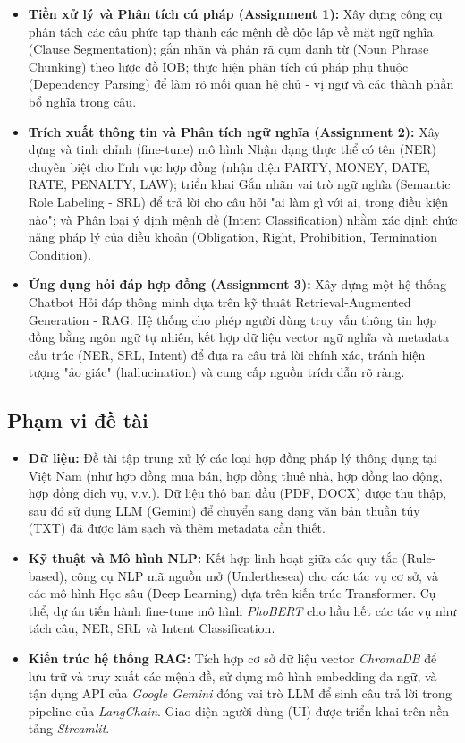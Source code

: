 \begin{itemize}
    \item \textbf{Tiền xử lý và Phân tích cú pháp (Assignment 1):} Xây dựng công cụ phân tách các câu phức tạp thành các mệnh đề độc lập về mặt ngữ nghĩa (Clause Segmentation); gắn nhãn và phân rã cụm danh từ (Noun Phrase Chunking) theo lược đồ IOB; thực hiện phân tích cú pháp phụ thuộc (Dependency Parsing) để làm rõ mối quan hệ chủ - vị ngữ và các thành phần bổ nghĩa trong câu.
    \item \textbf{Trích xuất thông tin và Phân tích ngữ nghĩa (Assignment 2):} Xây dựng và tinh chỉnh (fine-tune) mô hình Nhận dạng thực thể có tên (NER) chuyên biệt cho lĩnh vực hợp đồng (nhận diện PARTY, MONEY, DATE, RATE, PENALTY, LAW); triển khai Gắn nhãn vai trò ngữ nghĩa (Semantic Role Labeling - SRL) để trả lời cho câu hỏi "ai làm gì với ai, trong điều kiện nào"; và Phân loại ý định mệnh đề (Intent Classification) nhằm xác định chức năng pháp lý của điều khoản (Obligation, Right, Prohibition, Termination Condition).
    \item \textbf{Ứng dụng hỏi đáp hợp đồng (Assignment 3):} Xây dựng một hệ thống Chatbot Hỏi đáp thông minh dựa trên kỹ thuật Retrieval-Augmented Generation - RAG. Hệ thống cho phép người dùng truy vấn thông tin hợp đồng bằng ngôn ngữ tự nhiên, kết hợp dữ liệu vector ngữ nghĩa và metadata cấu trúc (NER, SRL, Intent) để đưa ra câu trả lời chính xác, tránh hiện tượng "ảo giác" (hallucination) và cung cấp nguồn trích dẫn rõ ràng.
\end{itemize}

\subsection{Phạm vi đề tài}
\begin{itemize}
    \item \textbf{Dữ liệu:} Đề tài tập trung xử lý các loại hợp đồng pháp lý thông dụng tại Việt Nam (như hợp đồng mua bán, hợp đồng thuê nhà, hợp đồng lao động, hợp đồng dịch vụ, v.v.). Dữ liệu thô ban đầu (PDF, DOCX) được thu thập, sau đó sử dụng LLM (Gemini) để chuyển sang dạng văn bản thuần túy (TXT) đã được làm sạch và thêm metadata cần thiết.
    \item \textbf{Kỹ thuật và Mô hình NLP:} Kết hợp linh hoạt giữa các quy tắc (Rule-based), công cụ NLP mã nguồn mở (Underthesea) cho các tác vụ cơ sở, và các mô hình Học sâu (Deep Learning) dựa trên kiến trúc Transformer. Cụ thể, dự án tiến hành fine-tune mô hình \textit{PhoBERT} cho hầu hết các tác vụ như tách câu, NER, SRL và Intent Classification.
    \item \textbf{Kiến trúc hệ thống RAG:} Tích hợp cơ sở dữ liệu vector \textit{ChromaDB} để lưu trữ và truy xuất các mệnh đề, sử dụng mô hình embedding đa ngữ, và tận dụng API của \textit{Google Gemini} đóng vai trò LLM để sinh câu trả lời trong pipeline của \textit{LangChain}. Giao diện người dùng (UI) được triển khai trên nền tảng \textit{Streamlit}.
\end{itemize}